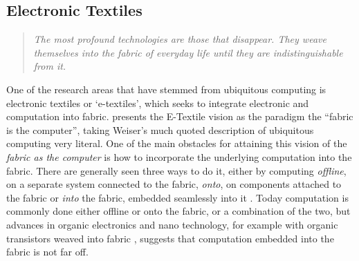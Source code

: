 \subsection{Electronic Textiles}
\begin{quotation}
\emph{The most profound technologies are those that disappear. They weave themselves into the fabric of everyday life until they are indistinguishable from it. \citep{weiser1991computer}}
\end{quotation}
One of the research areas that have stemmed from ubiquitous computing is electronic textiles or `e-textiles', which seeks to integrate electronic and computation into fabric.
\citet{park2002wearable} presents the E-Textile vision as the paradigm the ``fabric is the computer'', taking Weiser's much quoted description of ubiquitous computing very literal.
One of the main obstacles for attaining this vision of the \emph{fabric as the computer} is how to incorporate the underlying computation into the fabric.
There are generally seen three ways to do it, either by computing \emph{offline}, on a separate system connected to the fabric, \emph{onto}, on components attached to the fabric or \emph{into} the fabric, embedded seamlessly into it \citep{marculescu2003}.
Today computation is commonly done either offline or onto the fabric, or a combination of the two, but advances in organic electronics and nano technology, for example with organic transistors weaved into fabric \citep{lee2005weave}, suggests that computation embedded into the fabric is not far off.

